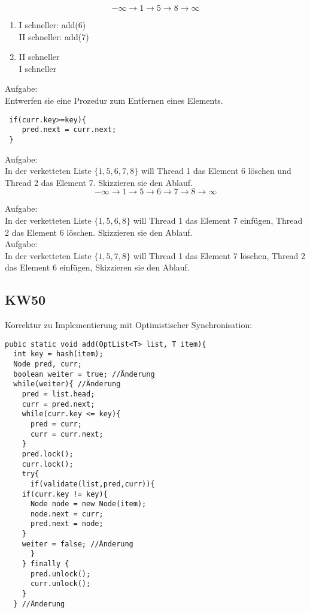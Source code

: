 \documentclass[a4paper,12pt]{scrartcl}
\begin{document}
$$-\infty\rightarrow1\rightarrow5\rightarrow8\rightarrow\infty$$
\begin{enumerate}
 \item 	I schneller: add(6)\\
	II schneller: add(7)
 \item II schneller\\
	I schneller
\end{enumerate}

Aufgabe:\\
Entwerfen sie eine Prozedur zum Entfernen eines Elements.\\
\begin{lstlisting}
 if(curr.key>=key){
    pred.next = curr.next;
 }
\end{lstlisting}

Aufgabe:\\
In der verketteten Liste $\{1,5,6,7,8\}$ will Thread 1 das Element 6 löschen und Thread 2 das Element 7. Skizzieren sie den Ablauf.
$$-\infty\rightarrow1\rightarrow5\rightarrow6\rightarrow7\rightarrow8\rightarrow\infty $$

Aufgabe:\\
In der verketteten Liste $\{1,5,6,8\}$ will Thread 1 das Element 7 einfügen, Thread 2 das Element 6 löschen. Skizzieren sie den Ablauf.
\\
Aufgabe:\\
In der verketteten Liste $\{1,5,7,8\}$ will Thread 1 das Element 7 löschen, Thread 2 das Element 6 einfügen, Skizzieren sie den Ablauf.

\subsection{KW50}

Korrektur zu Implementierung mit Optimistischer Synchronisation:
\begin{lstlisting}
pubic static void add(OptList<T> list, T item){
  int key = hash(item);
  Node pred, curr;
  boolean weiter = true; //Änderung
  while(weiter){ //Änderung
    pred = list.head;
    curr = pred.next;
    while(curr.key <= key){
      pred = curr;
      curr = curr.next;
    }
    pred.lock();
    curr.lock();
    try{
      if(validate(list,pred,curr)){
	if(curr.key != key){
	  Node node = new Node(item);
	  node.next = curr;
	  pred.next = node;
	}
	weiter = false; //Änderung
      } 
    } finally {
      pred.unlock();
      curr.unlock();
    }
  } //Änderung
\end{lstlisting}
\end{document}
